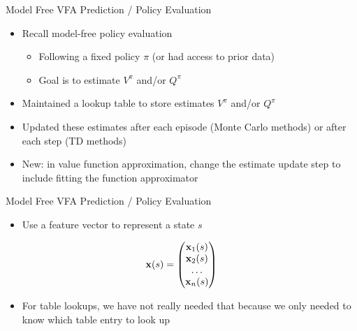 \documentclass[aspectratio=169]{../latex_main/tntbeamer}  %
\begin{document}
\begin{frame}[c]{Model Free VFA Prediction / Policy Evaluation}
	
	
	\begin{itemize}
		\item Recall model-free policy evaluation
		\begin{itemize}
			\item Following a fixed policy $\pi$ (or had access to prior data)
			\item Goal is to estimate $V^\pi$ and/or $Q^\pi$
		\end{itemize}
		\item Maintained a lookup table to store estimates $V^\pi$ and/or $Q^\pi$
		\item Updated these estimates after each episode (Monte Carlo methods)
		or after each step (TD methods)
		\item New: in value function approximation, change the estimate
		update step to include fitting the function approximator
	\end{itemize}
	
\end{frame}
\begin{frame}[c]{Model Free VFA Prediction / Policy Evaluation}
	
	
	\begin{itemize}
		\item Use a feature vector to represent a state $s$
	\end{itemize}

$$\mathbf{x}(s) = \begin{pmatrix}
\mathbf{x}_1(s)\\
\mathbf{x}_2(s)\\
\ldots\\
\mathbf{x}_n(s)
\end{pmatrix} $$

\begin{itemize}
	\item For table lookups, we have not really needed that because we only needed to know which table entry to look up
\end{itemize}
	
\end{frame}
\end{document}
